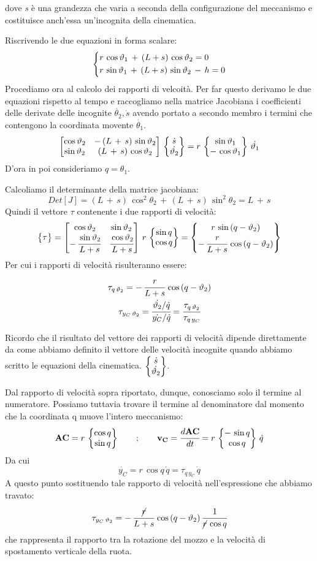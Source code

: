 dove \emph{s} è una grandezza che varia a seconda della configurazione del meccanismo e costituisce anch'essa un'incognita della cinematica.

Riscrivendo le due equazioni in forma scalare:
\[
\begin{dcases}
r\,\cos{\theta_1}\,+\,(L+s)\,\cos{\theta_2} = 0\\
r\,\sin{\theta_1}\,+\,(L+s)\,\sin{\theta_2}\,-\,h=0
\end{dcases}
\]
Procediamo ora al calcolo dei rapporti di velcoità. Per far questo derivamo le due equazioni rispetto al tempo e raccogliamo nella matrice Jacobiana i coefficienti delle derivate delle incognite $\dot{\theta_2}, \dot{s}$ avendo portato a secondo membro i termini che contengono la coordinata movente $\dot{\theta_1}$.
\[
\M{\cos{\theta_2}&-\,(L\,+\,s)\,\sin{\theta_2}\\\sin{\theta_2}&(L\,+\,s)\,\cos{\theta_2}}\,\B{\dot{s}\\\dot{\theta_2}} = r\,\B{\sin{\theta_1}\\-\,\cos{\theta_1}}\,\dot{\theta_1}
\]
D'ora in poi consideriamo $q = \theta_1$.

Calcoliamo il determinante della matrice jacobiana:
\[Det[J] = (L\,+\,s)\,\cos^2{\theta_2}\,+\,(L\,+\,s)\,\sin^2{\theta_2} = L\,+\,s\]
Quindi il vettore $\tau$ contenente i due rapporti di velocità:
\[\B{\tau} = \M{\cos{\theta_2}&\sin{\theta_2}\\-\,\cfrac{\sin{\theta_2}}{L+s}&\cfrac{\cos{\theta_2}}{L+s}}\,r\,\B{\sin{q}\\\cos{q}}=\B{r\,\sin{(q-\theta_2)}\\-\,\cfrac{r}{L+s}\,\cos{(q-\theta_2)}}\]
Per cui i rapporti di velocità risulteranno essere:
\begin{gather*}
\tau_{q\,\theta_2} = -\,\cfrac{r}{L+s}\,\cos{(q-\theta_2)}\\
\tau_{y_C\,\theta_2} = \cfrac{\dot{\theta_2}/\dot{q}}{\dot{y_C}/\dot{q}} = \cfrac{\tau_{q\,\theta_2}}{\tau_{q\,y_C}}
\end{gather*}

Ricordo che il risultato del vettore dei rapporti di velocità dipende direttamente da come abbiamo definito il vettore delle velocità incognite quando abbiamo scritto le equazioni della cinematica. $\B{\dot{s}\\\dot{\theta_2}}$.

Dal rapporto di velocità sopra riportato, dunque, conosciamo solo il termine al numeratore. Possiamo tuttavia trovare il termine al denominatore dal momento che la coordinata q muove l'intero meccanismo:
\[\mathbf{AC} = r\,\B{\cos{q}\\\sin{q}}\qquad;\qquad \mathbf{v_C}=\td{\mathbf{AC}}{t} = r\,\B{-\,\sin{q}\\\cos{q}}\,\dot{q}\]
Da cui
\[\dot{y_C} = r\,\cos{q}\,\dot{q} = \tau_{q\,y_C}\,\dot{q}\]
A questo punto sostituendo tale rapporto di velocità nell'espressione che abbiamo travato:
\[\tau_{y_C\,\theta_2} = -\,\cfrac{\cancel{r}}{L+s}\,\cos{(q-\theta_2)}\,\cfrac{1}{\cancel{r}\,\cos{q}}\]
che rappresenta il rapporto tra la rotazione del mozzo e la velocità di spostamento verticale della ruota.


